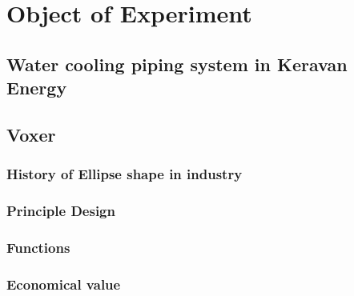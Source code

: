 
\chapter{Object of Experiment}

\section{Water cooling piping system in Keravan Energy}

\section{Voxer}
\subsection{History of Ellipse shape in industry}
\subsection{Principle Design}
\subsection{Functions}
\subsection{Economical value}
\clearpage %
